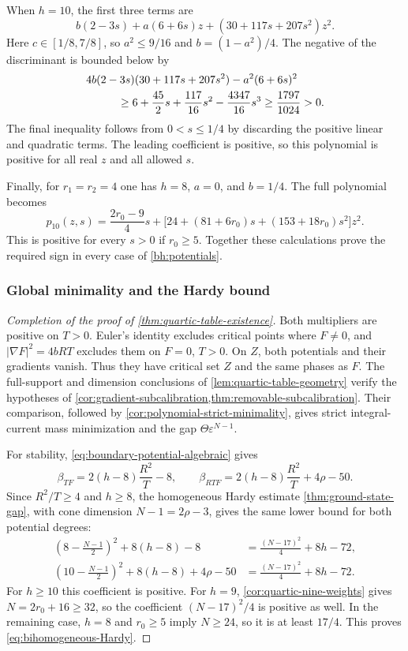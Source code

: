 When $h=10$, the first three terms are
\[
 b(2-3s)+a(6+6s)z+(30+117s+207s^2)z^2.
\]
Here $c\in[1/8,7/8]$, so $a^2\leq9/16$ and
$b=(1-a^2)/4$.  The negative of the discriminant is bounded below by
\begin{align*}
 &4b(2-3s)(30+117s+207s^2)-a^2(6+6s)^2\\
 &\hspace{10mm}\geq
 6+\frac{45}{2}s+\frac{117}{16}s^2-\frac{4347}{16}s^3
 \geq\frac{1797}{1024}>0.
\end{align*}
The final inequality follows from $0<s\leq1/4$ by discarding the
positive linear and quadratic terms. The leading coefficient is
positive, so this polynomial is positive for all real $z$ and all
allowed $s$.

Finally, for $r_1=r_2=4$ one has $h=8$, $a=0$, and $b=1/4$.
The full polynomial becomes
\begin{equation}\label{eq:quartic-balanced-eight-certificate}
 p_{10}(z,s)=\frac{2r_0-9}{4}s+
 \bigl[24+(81+6r_0)s+(153+18r_0)s^2\bigr]z^2.
\end{equation}
This is positive for every $s>0$ if $r_0\geq5$.
Together these calculations prove the required sign in every
case of \eqref{bh:potentials}.

\subsubsection{Global minimality and the Hardy bound}

\begin{proof}[Completion of the proof of \cref{thm:quartic-table-existence}]
\leavevmode\par\nobreak
Both multipliers are positive on $T>0$. Euler's identity excludes
critical points where $F\ne0$, and $|\nabla F|^2=4bRT$ excludes them
on $F=0$, $T>0$. On $Z$, both potentials and their gradients vanish.
Thus they have critical set $Z$ and the same phases as $F$.
The full-support and dimension conclusions of
\cref{lem:quartic-table-geometry} verify the hypotheses of
\cref{cor:gradient-subcalibration,thm:removable-subcalibration}.
Their comparison, followed by \cref{cor:polynomial-strict-minimality},
gives strict integral-current mass minimization and the gap
$\Theta\varepsilon^{N-1}$.

For stability, \eqref{eq:boundary-potential-algebraic} gives
\[
 \beta_{TF}=2(h-8)\frac{R^2}{T}-8,\qquad
 \beta_{RTF}=2(h-8)\frac{R^2}{T}+4\rho-50.
\]
Since $R^2/T\geq4$ and $h\geq8$, the homogeneous Hardy estimate
\cref{thm:ground-state-gap}, with cone dimension $N-1=2\rho-3$,
gives the same lower bound for both potential degrees:
\begin{align*}
 \left(8-\frac{N-1}{2}\right)^2+8(h-8)-8
 &=\frac{(N-17)^2}{4}+8h-72,\\
 \left(10-\frac{N-1}{2}\right)^2+8(h-8)+4\rho-50
 &=\frac{(N-17)^2}{4}+8h-72.
\end{align*}
For $h\geq10$ this coefficient is positive. For $h=9$,
\cref{cor:quartic-nine-weights} gives $N=2r_0+16\geq32$, so the
coefficient $(N-17)^2/4$ is positive as well. In the remaining
case, $h=8$ and $r_0\geq5$ imply $N\geq24$, so it is at least
$17/4$.  This proves \eqref{eq:bihomogeneous-Hardy}.
\end{proof}

